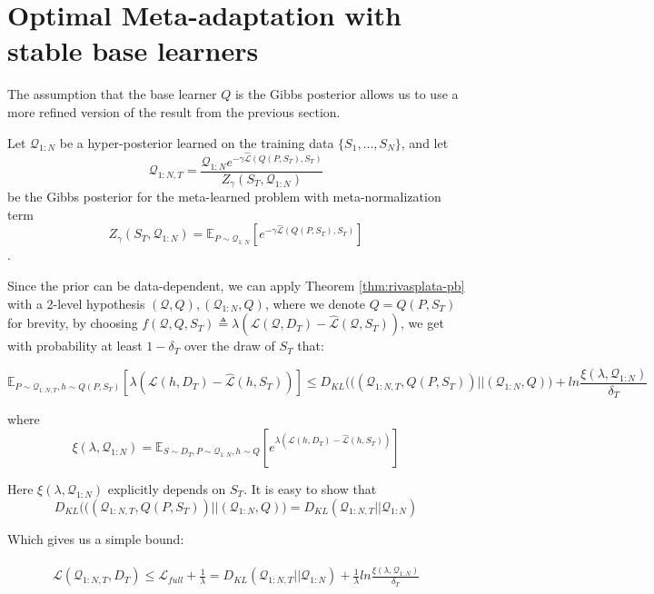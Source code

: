 \documentclass{article}
\theoremstyle{definition}
\newcommand{\Expect}[2]{\mathbb{E}_{#1}\left [#2 \right ]}
\begin{document}
\section{Optimal Meta-adaptation with stable base learners}

The assumption that the base learner $Q$ is the Gibbs posterior allows us to use a more refined version of the result from the previous section.

Let $\mathcal{Q}_{1:N}$ be a hyper-posterior learned on the training data $\{S_1,...,S_N\}$, and let $$\mathcal{Q}_{1:N,T}= \frac{\mathcal{Q}_{1:N}e^{-\gamma\hat{\mathcal{L}}(Q(P,S_T),S_T)}}{Z_\gamma(S_T, \mathcal{Q}_{1:N})}$$ be the Gibbs posterior for the meta-learned problem with meta-normalization term $$Z_\gamma(S_T, \mathcal{Q}_{1:N})=\Expect{P\sim \mathcal{Q}_{1:N}}{e^{-\gamma\hat{\mathcal{L}}(Q(P,S_T),S_T)}}$$.

Since the prior can be data-dependent, we can apply Theorem \ref{thm:rivasplata-pb} with a 2-level hypothesis $(\mathcal{Q},Q), (\mathcal{Q}_{1:N}, Q)$, where we denote $Q=Q(P, S_T)$ for brevity, by choosing $f(\mathcal{Q}, Q, S_T)\triangleq\lambda\left (\mathcal{L}(\mathcal{Q}, D_T)-\hat{\mathcal{L}}(\mathcal{Q}, S_T)\right )$, we get with probability at least $1-\delta_T$ over the draw of $S_T$ that:

$$\Expect{P\sim \mathcal{Q}_{1:N,T},h\sim Q(P,S_T)}{\lambda\left (\mathcal{L}(h, D_T)-\hat{\mathcal{L}}(h, S_T)\right )} \leq D_{KL} \Big (((\mathcal{Q}_{1:N,T}, Q(P,S_T))||(\mathcal{Q}_{1:N}, Q) \Big )+ ln\frac{\xi(\lambda,\mathcal{Q}_{1:N})}{\delta_T}$$

where $$\xi(\lambda,\mathcal{Q}_{1:N})=\Expect{S\sim D_T, P\sim \mathcal{Q}_{1:N}, h\sim Q}{e^{\lambda\left (\mathcal{L}(h, D_T)-\hat{\mathcal{L}}(h, S_T)\right )}}$$

Here $\xi(\lambda,\mathcal{Q}_{1:N})$ explicitly depends on $S_T$. 
It is easy to show that $$D_{KL} \Big (((\mathcal{Q}_{1:N,T}, Q(P,S_T))||(\mathcal{Q}_{1:N}, Q) \Big )=D_{KL}(\mathcal{Q}_{1:N,T}||\mathcal{Q}_{1:N})$$

Which gives us a simple bound:

\begin{align} \label{eq:data-dependent-base-bound}
\begin{split}
\mathcal{L}(\mathcal{Q}_{1:N,T}, D_T) \leq \mathcal{L}_{full} + \frac{1}{\lambda}=D_{KL}(\mathcal{Q}_{1:N,T}||\mathcal{Q}_{1:N}) + \frac{1}{\lambda}ln\frac{\xi(\lambda,\mathcal{Q}_{1:N})}{\delta_T}
\end{split}
\end{align}
\end{document}
